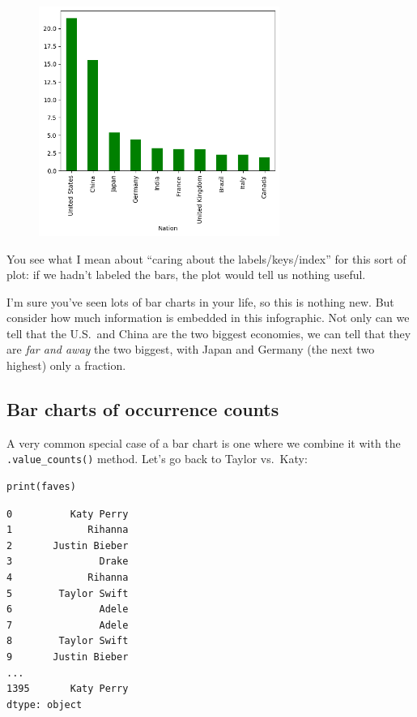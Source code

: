 \begin{figure}[ht]
\centering
\includegraphics[width=0.7\textwidth]{gdp2.png}
\end{figure}

You see what I mean about ``caring about the labels/keys/index'' for this sort
of plot: if we hadn't labeled the bars, the plot would tell us nothing useful.

I'm sure you've seen lots of bar charts in your life, so this is nothing new.
But consider how much information is embedded in this infographic. Not only can
we tell that the U.S.~and China are the two biggest economies, we can tell that
they are \textit{far and away} the two biggest, with Japan and Germany (the
next two highest) only a fraction.

\subsection{Bar charts of occurrence counts}

\label{categoricalDataBarCharts}


A very common special case of a bar chart is one where we combine it with the
\texttt{.value\_counts()} method. Let's go back to Taylor vs.~Katy:

\begin{Verbatim}[fontsize=\scriptsize,samepage=true,frame=single,framesep=3mm]
print(faves)
\end{Verbatim}
\vspace{-.3in}

\begin{Verbatim}[fontsize=\scriptsize,samepage=true,frame=leftline,framesep=5mm,framerule=1mm]
0          Katy Perry
1             Rihanna
2       Justin Bieber
3               Drake
4             Rihanna
5        Taylor Swift
6               Adele
7               Adele
8        Taylor Swift
9       Justin Bieber
...
1395       Katy Perry
dtype: object
\end{Verbatim}

